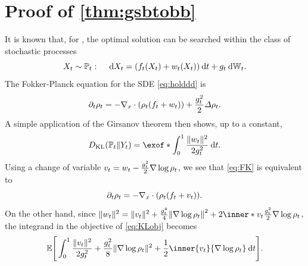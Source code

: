 
\section{Proof of \cref{thm:gsbtobb}}
\label{app:gsbtobb}


It is known that, for , the optimal solution can be searched within the class of stochastic processes \citep{leonard2013survey}
\begin{equation}
\label{eq:holddd}
X_t \sim \Pmargin: \quad\dd X_t =  (\driftf(X_t) + \vectalt(X_t) )\dt + \volat \dWiener[\ctime].
\end{equation}
The Fokker-Planck equation for the \acrshort{SDE} \eqref{eq:holddd} is
\begin{align}
\label{eq:FK}
\del_t \measure = - \Div \parens*{  \measure(  \driftf +\vectalt  ) } + \frac{\volatsq[\ctime]}{2}\Laplace \measure.
\end{align}
A simple application of the Girsanov theorem then shows, up to a constant, 
\begin{align}
\label{eq:KLobj}
\KL(\Pmargin \| \refsde) = \exof*{ \int_0^\horizon\frac{\norm{\vectalt}^2}{2\volatsq[\ctime]}   \dt}.
\end{align}
Using a change of variable $\vect = \vectalt - \frac{\volatsq[\ctime]}{2}\nabla\log\measure$, we see that \eqref{eq:FK} is equivalent to
\begin{equation}
\del_t \measure = - \Div \parens*{  \measure(  \driftf +\vect  ) }.
\end{equation}
On the other hand, since $\norm{\vectalt}^2 = \norm{\vect}^2 + \frac{\volat^4}{4}\norm*{\nabla\log\measure}^2 + 2 \inner*{\vect}{ \frac{\volatsq[\ctime]}{2}\nabla\log\measure}$, the integrand in the objective of \eqref{eq:KLobj} becomes 
\begin{align}
 \mathbb{E}\Bigg[\int_0^\horizon  \frac{\norm{\vect}^2}{2\volatsq[\ctime]} + \frac{\volatsq[\ctime]}{8} \norm{\nabla \log \measure}^2  + \frac{1}{2} \inner{\vect}{\nabla \log\measure} \dt\Bigg].
\end{align}


